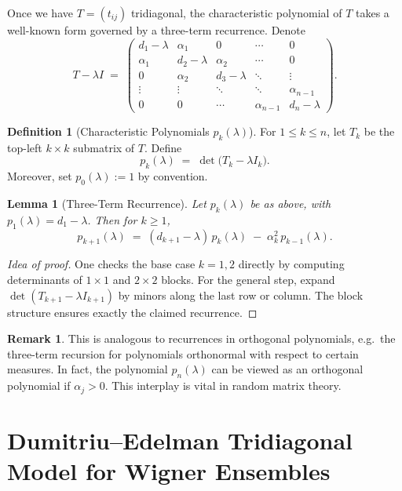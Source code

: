 \documentclass[letterpaper,11pt,oneside,reqno]{article}
\numberwithin{equation}{section}
\newtheorem{lemma}[proposition]{Lemma}
\theoremstyle{definition}
\newtheorem{definition}[proposition]{Definition}
\newtheorem{remark}[proposition]{Remark}
\begin{document}
Once we have $T = (t_{ij})$ tridiagonal, the characteristic polynomial of $T$ takes a well-known form governed by a three-term recurrence. Denote
\[
  T - \lambda I \;=\;
  \begin{pmatrix}
    d_1 - \lambda & \alpha_1 & 0 & \cdots & 0 \\
    \alpha_1 & d_2 - \lambda & \alpha_2 & \cdots & 0 \\
    0        & \alpha_2 & d_3 - \lambda & \ddots & \vdots \\
    \vdots   & \vdots   & \ddots & \ddots & \alpha_{n-1} \\
    0        & 0        & \cdots & \alpha_{n-1} & d_n - \lambda
  \end{pmatrix}.
\]

\begin{definition}[Characteristic Polynomials $p_k(\lambda)$]
For $1 \le k \le n$, let $T_k$ be the top-left $k \times k$ submatrix of $T$. Define
\[
  p_k(\lambda) \;=\; \det\bigl(T_k - \lambda I_k\bigr).
\]
Moreover, set $p_0(\lambda):=1$ by convention.
\end{definition}

\begin{lemma}[Three-Term Recurrence]
\label{lem:3term-recurrence}
Let $p_k(\lambda)$ be as above, with $p_1(\lambda) = d_1 - \lambda$. Then for $k \ge 1$,
\[
  p_{k+1}(\lambda)
  \;=\;
  (d_{k+1} - \lambda)\,p_k(\lambda)
  \;-\;\alpha_k^2\,p_{k-1}(\lambda).
\]
\end{lemma}

\begin{proof}[Idea of proof]
One checks the base case $k=1,2$ directly by computing determinants of $1\times1$ and $2\times2$ blocks. For the general step, expand $\det(T_{k+1}-\lambda I_{k+1})$ by minors along the last row or column. The block structure ensures exactly the claimed recurrence.
\end{proof}

\begin{remark}
This is analogous to recurrences in orthogonal polynomials, e.g.\ the three-term recursion for polynomials orthonormal with respect to certain measures. In fact, the polynomial $p_n(\lambda)$ can be viewed as an orthogonal polynomial if $\alpha_j>0$. This interplay is vital in random matrix theory.
\end{remark}

\section{Dumitriu--Edelman Tridiagonal Model for Wigner Ensembles}
\label{sec:dumitriu-edelman}
\end{document}

